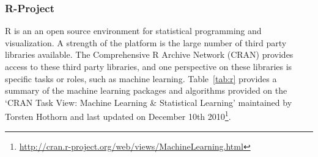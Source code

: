 \documentclass[a4paper, 11pt]{article}
\begin{document}
\subsubsection{R-Project}
R is an an open source environment for statistical programming and visualization. A strength of the platform is the large number of third party libraries available. The Comprehensive R Archive Network (CRAN) provides access to these third party libraries, and one perspective on these libraries is specific tasks or roles, such as machine learning. Table~\ref{tab:r} provides a summary of the machine learning packages and algorithms provided on the `CRAN Task View: Machine Learning \& Statistical Learning' maintained by Torsten Hothorn and last updated on December 10th 2010\footnote{\url{http://cran.r-project.org/web/views/MachineLearning.html}}.  
\end{document}
